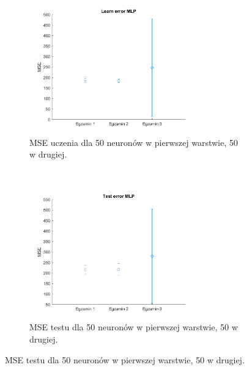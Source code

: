 \documentclass[12pt]{article}
\begin{document}
\begin{figure}[H]
\centering
\begin{subfigure}[t]{0.48\textwidth} 
\centering
\includegraphics[height=2.2in]{logsig_tansig_tansig20_learn.png}
\caption{MSE uczenia dla  50 neuronów w pierwszej warstwie, 50 w drugiej.}
\end{subfigure}
~~
\begin{subfigure}[t]{0.48\textwidth} 
\centering
\includegraphics[height=2.2in]{logsig_tansig_tansig20_test.png}
\caption{MSE testu dla  50 neuronów w pierwszej warstwie, 50 w drugiej.}
\end{subfigure}


\end{figure}
\end{document}
